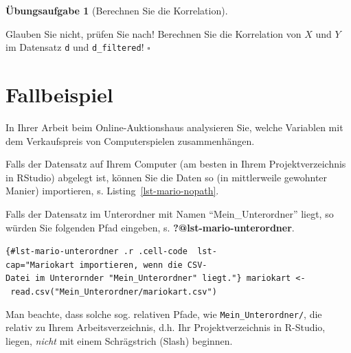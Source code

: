 \documentclass[
  a4paper,
]{scrbook}
\newenvironment{Shaded}{\begin{snugshade}}{\end{snugshade}}
\newcommand{\FunctionTok}[1]{\textcolor[rgb]{0.28,0.35,0.67}{#1}}
\newcommand{\NormalTok}[1]{\textcolor[rgb]{0.00,0.23,0.31}{#1}}
\newcommand{\OtherTok}[1]{\textcolor[rgb]{0.00,0.23,0.31}{#1}}
\newcommand{\StringTok}[1]{\textcolor[rgb]{0.13,0.47,0.30}{#1}}
\theoremstyle{definition}
\theoremstyle{definition}
\theoremstyle{definition}
\newtheorem{exercise}{Übungsaufgabe}[chapter]
\theoremstyle{remark}
\begin{document}
\begin{exercise}[Berechnen Sie die
Korrelation]\protect\hypertarget{exr-corr-range}{}\label{exr-corr-range}

Glauben Sie nicht, prüfen Sie nach! Berechnen Sie die Korrelation von
\(X\) und \(Y\) im Datensatz \texttt{d} und \texttt{d\_filtered}!
\(\square\)

\end{exercise}

\section{Fallbeispiel}\label{fallbeispiel}

In Ihrer Arbeit beim Online-Auktionshaus analysieren Sie, welche
Variablen mit dem Verkaufspreis von Computerspielen zusammenhängen.

Falls der Datensatz auf Ihrem Computer (am besten in Ihrem
Projektverzeichnis in RStudio) abgelegt ist, können Sie die Daten so (in
mittlerweile gewohnter Manier) importieren, s.
Listing~\ref{lst-mario-nopath}.

\begin{codelisting}

\caption{\label{lst-mario-nopath}Mariokart importieren, wenn die
CSV-Datei im aktuellen Projektordner liegt.}

\centering{

\begin{Shaded}
\begin{Highlighting}[]
\NormalTok{mariokart }\OtherTok{\textless{}{-}} \FunctionTok{read.csv}\NormalTok{(}\StringTok{"mariokart.csv"}\NormalTok{)}
\end{Highlighting}
\end{Shaded}

}

\end{codelisting}%

Falls der Datensatz im Unterordner mit Namen ``Mein\_Unterordner''
liegt, so würden Sie folgenden Pfad eingeben, s.
\textbf{?@lst-mario-unterordner}.

\texttt{\{\#lst-mario-unterordner\ .r\ .cell-code\ \ lst-cap="Mariokart\ importieren,\ wenn\ die\ CSV-Datei\ im\ Unterornder\ "Mein\_Unterordner"\ liegt."\}\ mariokart\ \textless{}-\ read.csv("Mein\_Unterordner/mariokart.csv")}

Man beachte, dass solche sog. relativen Pfade, wie
\texttt{Mein\_Unterordner/}, die relativ zu Ihrem Arbeitsverzeichnis,
d.h. Ihr Projektverzeichnis in R-Studio, liegen, \emph{nicht} mit einem
Schrägstrich (Slash) beginnen.
\end{document}
